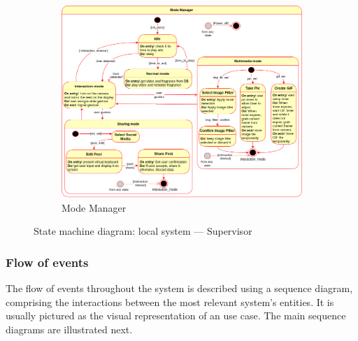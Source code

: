 \begin{figure}[htb!]
%
%
  \begin{subfigure}{.9\textwidth}
  \includegraphics[width=\textwidth]{img/state-mach-local-superv-mode.png}%
  \caption{Mode Manager}%
  \label{fig:state-mach-local-superv-mode}
\end{subfigure}
  \caption{State machine diagram: local system --- Supervisor}%
  \label{fig:state-mach-local-superv}
\end{figure}
%
%
\subsubsection{Flow of events}%
\label{sec:flow-events}
The flow of events throughout the system is described using a sequence diagram,
comprising the interactions between the most relevant system's entities. It is
usually pictured as the visual representation of an use case. The main sequence
diagrams are illustrated next.

